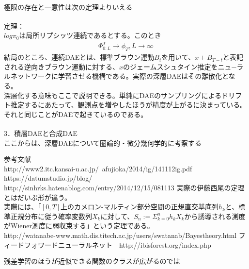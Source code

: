 \documentclass{jsarticle}
\begin{document}
　\\
極限の存在と一意性は次の定理よりいえる\\ 
　\\
定理：\\
$log \pi_0$は局所リプシッツ連続であるとする。このとき
\begin{eqnarray}
\Phi^T_{0:L}\rightarrow \phi_T ,L\rightarrow \infty
\end{eqnarray}
結局のところ、連続DAEとは、標準ブラウン運動$B_t$を用いて、$x+B_{T-t}$と表記される逆向きブラウン運動に対する、$x$のジェームスシュタイン推定をニュ−ラルネットワークに学習させる機構である。実際の深層DAEはその離散化となる。\\
深層化する意味もここで説明できる。単純にDAEのサンプリングによるドリフト推定するにあたって、観測点を増やしたほうが精度が上がるに決まっている。それと同じことがDAEで起きているのである。\\
　\\
3．積層DAEと合成DAE\\
ここからは、深層DAEについて圏論的・微分幾何学的に考察する










\newpage
参考文献\\

http://www2.itc.kansai-u.ac.jp/~afujioka/2014/ig/141112ig.pdf
https://datumstudio.jp/blog/\\
http://sinhrks.hatenablog.com/entry/2014/12/15/081113
実際の伊藤西尾の定理とはだいぶ形が違う。\\

実際には、「$[0,T]$上のカメロン-マルティン部分空間の正規直交基底列$h_k$と、標準正規分布に従う確率変数列$X_k$に対して、$S_n:=\Sigma^n_{k=0}h_kX_k$から誘導される測度がWiener測度に弱収束する」という定理である。
　\\http://watanabe-www.math.dis.titech.ac.jp/users/swatanab/Bayestheory.html
フィードフォワードニューラルネット　http://ibisforest.org/index.php%

残差学習のほうが近似できる関数のクラスが広がるのでは
\end{document}
